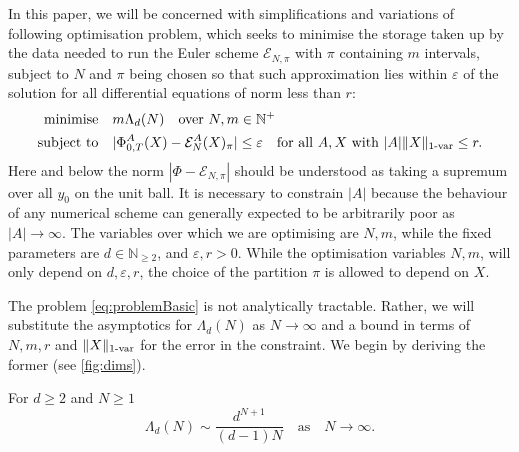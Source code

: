 \documentclass{article}
\newcommand{\var}[1]{{#1 \mathchar"2D \mathrm{var}}}
\def\eps{\varepsilon}
\numberwithin{equation}{section}
\theoremstyle{definition}
\theoremstyle{remark}
\begin{document}
In this paper, we will be concerned with simplifications and variations of following optimisation problem, which seeks to minimise the storage taken up by the data needed to run the Euler scheme $\mathcal E_{N, \pi}$ with $\pi$ containing $m$ intervals, subject to $N$ and $\pi$ being chosen so that such approximation lies within $\varepsilon$ of the solution for all differential equations of norm less than $r$: 
\begin{equation}\label{eq:problemBasic}
\begin{split}
\text{minimise}\quad & m\Lambda_d(N) \quad \text{over } N, m \in \mathbb N^+ \\
\text{subject to}\quad &|\Phi_{0,T}^A(X) - \mathcal E_N^A(X)_\pi | \leq \varepsilon \quad \text{for all } A, X \text{ with } |A| \|X\|_{\var{1}} \leq r.
\end{split}
\end{equation}
Here and below the norm $|\Phi - \mathcal E_{N,\pi}|$ should be understood as taking a supremum over all $y_0$ on the unit ball. It is necessary to constrain $|A|$ because the behaviour of any numerical scheme can generally expected to be arbitrarily poor as $|A| \to \infty$. The variables over which we are optimising are $N, m$, while the fixed parameters are $d \in \mathbb N_{\geq 2}$, and $\varepsilon, r > 0$. While the optimisation variables $N, m$, will only depend on $d, \eps, r$, the choice of the partition $\pi$ is allowed to depend on $X$.

The problem \eqref{eq:problemBasic} is not analytically tractable. Rather, we will substitute the asymptotics for $\Lambda_d(N)$ as $N \to \infty$ and a bound in terms of $N, m, r$ and $\| X \|_{\var{1}}$ for the error in the constraint. We begin by deriving the former (see \autoref{fig:dims}).

\begin{theorem}\label{thm:dims}
	For $d \geq 2$ and $N \geq 1$
	\[
	\Lambda_d (N) \sim \frac{d^{N+1}}{(d-1)N} \quad \text{as} \quad N \to \infty .
	\]
\end{theorem}
\end{document}
